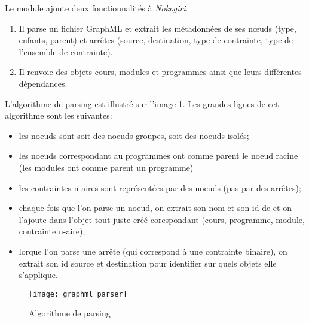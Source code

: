 Le module ajoute deux fonctionnalités à \textit{Nokogiri}.
\begin{enumerate}
  \item Il parse un fichier GraphML et extrait les métadonnées de ses nœuds (type, enfants, parent) et arrêtes (source, destination, type de contrainte, type de l'ensemble de contrainte). 
  \item Il renvoie des objets cours, modules et programmes ainsi que leurs différentes dépendances.  
\end{enumerate}

L'algorithme de parsing est illustré sur l'image \ref{fig:graphml_parser}. Les grandes lignes de cet algorithme sont les suivantes:

\begin{itemize}
\item les noeuds sont soit des noeuds groupes, soit des noeuds isolés;
\item les noeuds correspondant au programmes ont comme parent le noeud racine (les modules ont comme parent un programme)
\item les contraintes n-aires sont représentées par des noeuds (pas par des arrêtes);
\item chaque fois que l'on parse un noeud, on extrait son nom et son id de et on l'ajoute dans l'objet  tout juste créé corespondant (cours, programme, module, contrainte n-aire);
\item lorque l'on parse une arrête (qui correspond à une contrainte binaire), on extrait son id source et destination pour identifier sur quels objets elle s'applique. 
\end{itemize}

\begin{figure}
\centering
\caption{Algorithme de parsing}
\label{fig:graphml_parser}
\texttt{[image: graphml\_parser]}
\end{figure}




